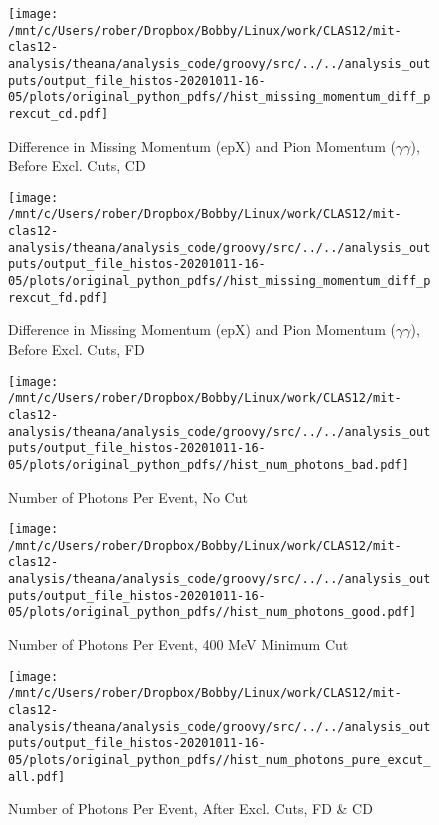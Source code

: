 \documentclass{article}
\begin{document}
\begin{landscape}
\begin{figure}[h]
        \texttt{[image: /mnt/c/Users/rober/Dropbox/Bobby/Linux/work/CLAS12/mit-clas12-analysis/theana/analysis\_code/groovy/src/../../analysis\_outputs/output\_file\_histos-20201011-16-05/plots/original\_python\_pdfs//hist\_missing\_momentum\_diff\_prexcut\_cd.pdf]}
        \captionsetup{textformat=empty,labelformat=blank}
        \caption{Difference in Missing Momentum (epX) and Pion Momentum ($\gamma$$\gamma$), Before Excl. Cuts, CD}
    \end{figure}
    \clearpage
    
    \begin{figure}[h]
        \centering

        \texttt{[image: /mnt/c/Users/rober/Dropbox/Bobby/Linux/work/CLAS12/mit-clas12-analysis/theana/analysis\_code/groovy/src/../../analysis\_outputs/output\_file\_histos-20201011-16-05/plots/original\_python\_pdfs//hist\_missing\_momentum\_diff\_prexcut\_fd.pdf]}
        \captionsetup{textformat=empty,labelformat=blank}
        \caption{Difference in Missing Momentum (epX) and Pion Momentum ($\gamma$$\gamma$), Before Excl. Cuts, FD}
    \end{figure}
    \clearpage
    
    \begin{figure}[h]
        \centering

        \texttt{[image: /mnt/c/Users/rober/Dropbox/Bobby/Linux/work/CLAS12/mit-clas12-analysis/theana/analysis\_code/groovy/src/../../analysis\_outputs/output\_file\_histos-20201011-16-05/plots/original\_python\_pdfs//hist\_num\_photons\_bad.pdf]}
        \captionsetup{textformat=empty,labelformat=blank}
        \caption{Number of Photons Per Event, No Cut}
    \end{figure}
    \clearpage
    
    \begin{figure}[h]
        \centering

        \texttt{[image: /mnt/c/Users/rober/Dropbox/Bobby/Linux/work/CLAS12/mit-clas12-analysis/theana/analysis\_code/groovy/src/../../analysis\_outputs/output\_file\_histos-20201011-16-05/plots/original\_python\_pdfs//hist\_num\_photons\_good.pdf]}
        \captionsetup{textformat=empty,labelformat=blank}
        \caption{Number of Photons Per Event, 400 MeV Minimum Cut}
    \end{figure}
    \clearpage
    
    \begin{figure}[h]
        \centering

        \texttt{[image: /mnt/c/Users/rober/Dropbox/Bobby/Linux/work/CLAS12/mit-clas12-analysis/theana/analysis\_code/groovy/src/../../analysis\_outputs/output\_file\_histos-20201011-16-05/plots/original\_python\_pdfs//hist\_num\_photons\_pure\_excut\_all.pdf]}
        \captionsetup{textformat=empty,labelformat=blank}
        \caption{Number of Photons Per Event, After Excl. Cuts, FD \& CD}
    \end{figure}
    \clearpage
    

\end{landscape}
\end{document}
